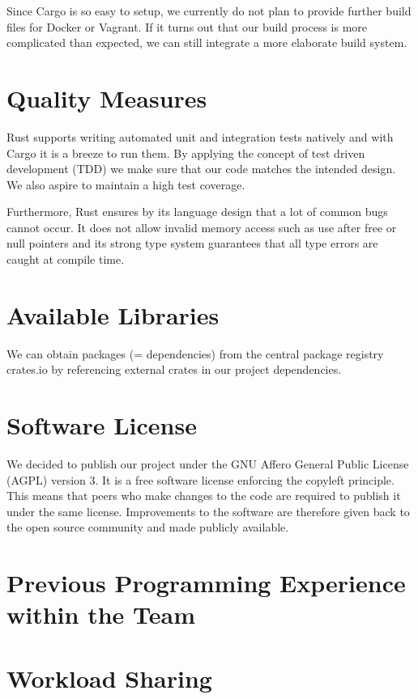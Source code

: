\documentclass[a4paper, 11pt]{article}
\begin{document}
Since Cargo is so easy to setup, we currently do not plan to provide further build files for Docker or Vagrant. If it turns out that our build process is more complicated than expected, we can still integrate a more elaborate build system.

\section*{Quality Measures}
Rust supports writing automated unit and integration tests natively and with Cargo it is a breeze to run them. By applying the concept of test driven development (TDD) we make sure that our code matches the intended design. We also aspire to maintain a high test coverage.

Furthermore, Rust ensures by its language design that a lot of common bugs cannot occur. It does not allow invalid memory access such as use after free or null pointers and its strong type system guarantees that all type errors are caught at compile time.

\section*{Available Libraries}
We can obtain packages (= dependencies) from the central package registry crates.io \cite{Crates} by referencing external crates in our project dependencies.

\section*{Software License}
We decided to publish our project under the GNU Affero General Public License (AGPL) version 3. It is a free software license enforcing the copyleft principle. This means that peers who make changes to the code are required to publish it under the same license. Improvements to the software are therefore given back to the open source community and made publicly available. 


\section*{Previous Programming Experience within the Team}
\lipsum[7]

\section*{Workload Sharing}
\lipsum[8]
\end{document}
